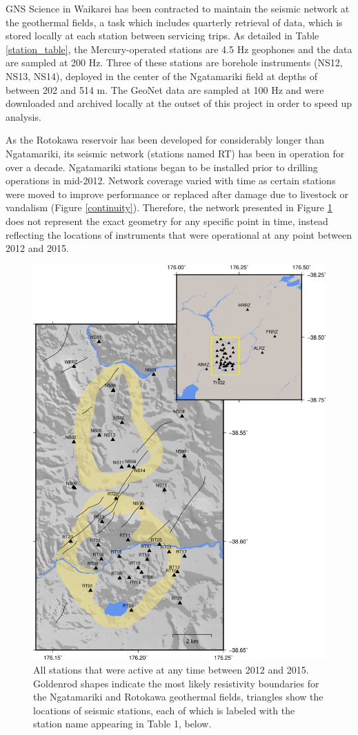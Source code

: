 GNS Science in Waikarei has been contracted to maintain the seismic network at the geothermal fields, a task which includes quarterly retrieval of data, which is stored locally at each station between servicing trips. As detailed in Table \ref{station_table}, the Mercury-operated stations are 4.5 Hz geophones and the data are sampled at 200 Hz. Three of these stations are borehole instruments (NS12, NS13, NS14), deployed in the center of the Ngatamariki field at depths of between 202 and 514 m. The GeoNet data are sampled at 100 Hz and were downloaded and archived locally at the outset of this project in order to speed up analysis.

As the Rotokawa reservoir has been developed for considerably longer than Ngatamariki, its seismic network (stations named RT) has been in operation for over a decade. Ngatamariki stations began to be installed prior to drilling operations in mid-2012. Network coverage varied with time as certain stations were moved to improve performance or replaced after damage due to livestock or vandalism (Figure \ref{continuity}). Therefore, the network presented in Figure \ref{322599} does not represent the exact geometry for any specific point in time, instead reflecting the locations of instruments that were operational at any point between 2012 and 2015.

\begin{figure}[h!]
\begin{center}
\includegraphics[width=0.70\columnwidth]{Chapter_2_Data/figures/RotNga_stations_overview/RotNga_stations_overview}
\caption[Seismograph station map]{{
All stations that were active at any time between 2012 and 2015.
Goldenrod shapes indicate the most likely resistivity boundaries for the
Ngatamariki and Rotokawa geothermal fields, triangles show the locations
of seismic stations, each of which is labeled with the station name
appearing in Table 1, below.
{\label{322599}}%
}}
\end{center}
\end{figure}

